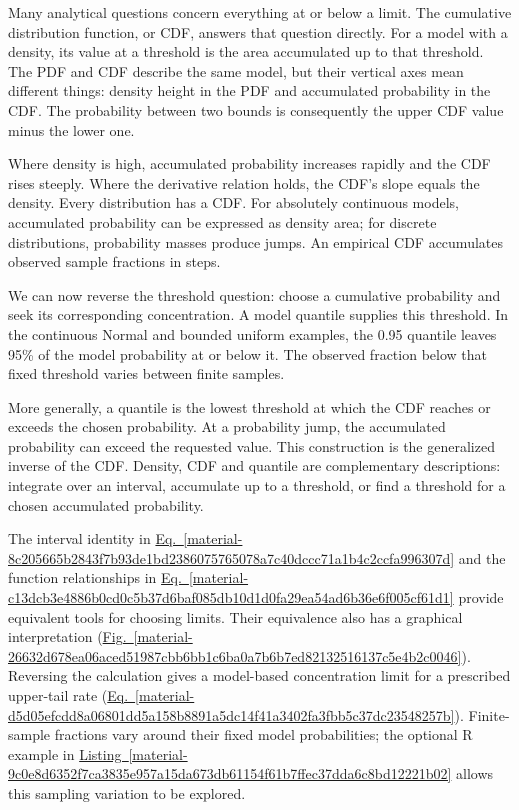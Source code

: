 \documentclass[11pt,a4paper]{article}
\begin{document}
\medskip

Many analytical questions concern everything at or below a limit. The cumulative distribution function, or CDF, answers that question directly. For a model with a density, its value at a threshold is the area accumulated up to that threshold. The PDF and CDF describe the same model, but their vertical axes mean different things: density height in the PDF and accumulated probability in the CDF. The probability between two bounds is consequently the upper CDF value minus the lower one.


Where density is high, accumulated probability increases rapidly and the CDF rises steeply. Where the derivative relation holds, the CDF's slope equals the density. Every distribution has a CDF. For absolutely continuous models, accumulated probability can be expressed as density area; for discrete distributions, probability masses produce jumps. An empirical CDF accumulates observed sample fractions in steps.


We can now reverse the threshold question: choose a cumulative probability and seek its corresponding concentration. A model quantile supplies this threshold. In the continuous Normal and bounded uniform examples, the 0.95 quantile leaves 95\% of the model probability at or below it. The observed fraction below that fixed threshold varies between finite samples.


More generally, a quantile is the lowest threshold at which the CDF reaches or exceeds the chosen probability. At a probability jump, the accumulated probability can exceed the requested value. This construction is the generalized inverse of the CDF. Density, CDF and quantile are complementary descriptions: integrate over an interval, accumulate up to a threshold, or find a threshold for a chosen accumulated probability.


The interval identity in \hyperref[material-8c205665b2843f7b93de1bd2386075765078a7c40dccc71a1b4c2ccfa996307d]{Eq.~\ref*{material-8c205665b2843f7b93de1bd2386075765078a7c40dccc71a1b4c2ccfa996307d}} and the function relationships in \hyperref[material-c13dcb3e4886b0cd0c5b37d6baf085db10d1d0fa29ea54ad6b36e6f005cf61d1]{Eq.~\ref*{material-c13dcb3e4886b0cd0c5b37d6baf085db10d1d0fa29ea54ad6b36e6f005cf61d1}} provide equivalent tools for choosing limits. Their equivalence also has a graphical interpretation (\hyperref[material-26632d678ea06aced51987cbb6bb1c6ba0a7b6b7ed82132516137c5e4b2c0046]{Fig.~\ref*{material-26632d678ea06aced51987cbb6bb1c6ba0a7b6b7ed82132516137c5e4b2c0046}}). Reversing the calculation gives a model-based concentration limit for a prescribed upper-tail rate (\hyperref[material-d5d05efcdd8a06801dd5a158b8891a5dc14f41a3402fa3fbb5c37dc23548257b]{Eq.~\ref*{material-d5d05efcdd8a06801dd5a158b8891a5dc14f41a3402fa3fbb5c37dc23548257b}}). Finite-sample fractions vary around their fixed model probabilities; the optional R example in \hyperref[material-9c0e8d6352f7ca3835e957a15da673db61154f61b7ffec37dda6c8bd12221b02]{Listing~\ref*{material-9c0e8d6352f7ca3835e957a15da673db61154f61b7ffec37dda6c8bd12221b02}} allows this sampling variation to be explored.
\end{document}
